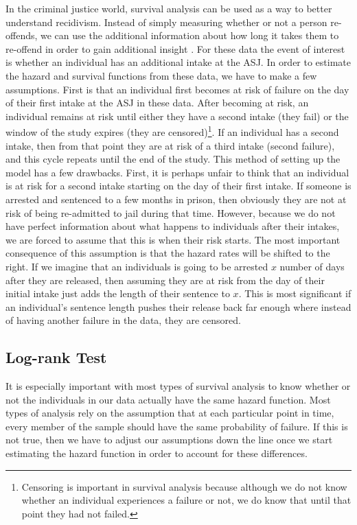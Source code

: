\documentclass{article}
\begin{document}
In the criminal justice world, survival analysis can be used as a way to better understand recidivism. Instead of simply measuring whether or not a person re-offends, we can use the additional information about how long it takes them to re-offend in order to gain additional insight \parencite{dejong}. For these data the event of interest is whether an individual has an additional intake at the ASJ. In order to estimate the hazard and survival functions from these data, we have to make a few assumptions. First is that an individual first becomes at risk of failure on the day of their first intake at the ASJ in these data. After becoming at risk, an individual remains at risk until either they have a second intake (they fail) or the window of the study expires (they are censored)\footnote{Censoring is important in survival analysis because although we do not know whether an individual experiences a failure or not, we do know that until that point they had not failed.}. If an individual has a second intake, then from that point they are at risk of a third intake (second failure), and this cycle repeats until the end of the study. This method of setting up the model has a few drawbacks. First, it is perhaps unfair to think that an individual is at risk for a second intake starting on the day of their first intake. If someone is arrested and sentenced to a few months in prison, then obviously they are not at risk of being re-admitted to jail during that time. However, because we do not have perfect information about what happens to individuals after their intakes, we are forced to assume that this is when their risk starts. The most important consequence of this assumption is that the hazard rates will be shifted to the right. If we imagine that an individuals is going to be arrested $x$ number of days after they are released, then assuming they are at risk from the day of their initial intake just adds the length of their sentence to $x$. This is most significant if an individual's sentence length pushes their release back far enough where instead of having another failure in the data, they are censored. 

\subsection{Log-rank Test}
It is especially important with most types of survival analysis to know whether or not the individuals in our data actually have the same hazard function. Most types of analysis rely on the assumption that at each particular point in time, every member of the sample should have the same probability of failure. If this is not true, then we have to adjust our assumptions down the line once we start estimating the hazard function in order to account for these differences. 
\end{document}
